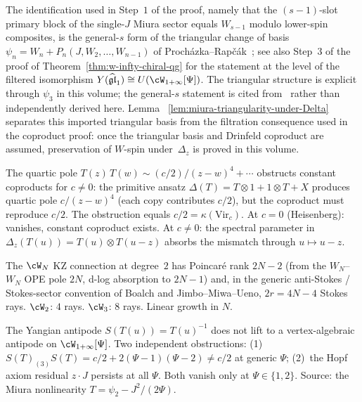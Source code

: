 \begin{remark}
\label{rem:miura-triangularity-attribution-monograph}
The identification used in Step~$1$ of the proof,
namely that the $(s-1)$-slot primary block of the single-$J$
Miura sector equals $W_{s-1}$ modulo lower-spin composites,
is the general-$s$ form of the triangular change of basis
$\psi_n = W_n + P_n(J, W_2, \ldots, W_{n-1})$ of
Proch\'azka--Rap\v{c}\'ak~\cite{PR19}; see also
Step~$3$ of the proof of
Theorem~\textup{\ref{thm:w-infty-chiral-qg}} for the statement
at the level of the filtered isomorphism
$Y(\widehat{\mathfrak{gl}}_1) \cong U(\cW_{1+\infty}[\Psi])$.
The triangular structure is explicit through $\psi_3$ in this
volume; the general-$s$ statement is cited from~\cite{PR19}
rather than independently derived here.  Lemma~
\ref{lem:miura-triangularity-under-Delta} separates this imported
triangular basis from the filtration consequence used in the
coproduct proof: once the triangular basis and Drinfeld coproduct
are assumed, preservation of $W$-spin under~$\Delta_z$ is proved in
this volume.
\end{remark}

\begin{remark}
\label{rem:conformal-anomaly-monograph}
The quartic pole $T(z)\,T(w) \sim (c/2)/(z-w)^4 + \cdots$
obstructs constant coproducts for $c \neq 0$: the primitive
ansatz $\Delta(T) = T \otimes 1 + 1 \otimes T + X$ produces
quartic pole $c/(z-w)^4$ (each copy contributes $c/2$), but
the coproduct must reproduce $c/2$. The obstruction equals
$c/2 = \kappa(\mathrm{Vir}_c)$. At $c = 0$ (Heisenberg):
vanishes, constant coproduct exists. At $c \neq 0$: the
spectral parameter in $\Delta_z(T(u)) = T(u) \otimes T(u - z)$
absorbs the mismatch through $u \mapsto u - z$.
\end{remark}

\begin{remark}
\label{rem:stokes-wN-monograph}
The $\cW_N$ KZ connection at degree~$2$ has Poincar\'e rank
$2N - 2$ \textup{(}from the $W_N$--$W_N$ OPE pole $2N$,
d-log absorption to $2N - 1$\textup{)} and, in the
generic anti-Stokes / Stokes-sector convention of
Boalch and Jimbo--Miwa--Ueno, $2r = 4N - 4$ Stokes rays.
$\cW_2$: $4$ rays. $\cW_3$: $8$ rays. Linear growth in $N$.
\end{remark}

\begin{remark}
\label{rem:antipode-monograph}
The Yangian antipode $S(T(u)) = T(u)^{-1}$ does not lift
to a vertex-algebraic antipode on $\cW_{1+\infty}[\Psi]$.
Two independent obstructions:
\textup{(1)}~$S(T)_{(3)}S(T) = c/2 + 2(\Psi-1)(\Psi-2)
\neq c/2$ at generic $\Psi$;
\textup{(2)}~the Hopf axiom residual $z \cdot J$ persists
at all $\Psi$. Both vanish only at $\Psi \in \{1, 2\}$.
Source: the Miura nonlinearity $T = \psi_2 - J^2/(2\Psi)$.
\end{remark}

